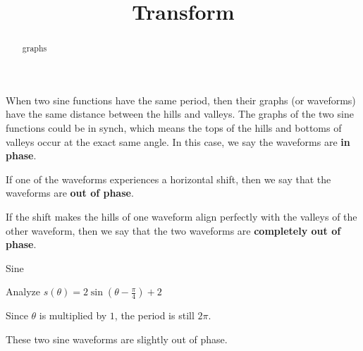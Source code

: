 \documentclass{ximera}
\title{Transform}
\begin{document}
\begin{abstract}
graphs
\end{abstract}
\maketitle



When two sine functions have the same period, then their graphs (or waveforms) have the same distance between the hills and valleys.   The graphs of the two sine functions could be in synch, which means the tops of the hills and bottoms of valleys occur at the exact same angle.  In this case, we say the waveforms are \textbf{in phase}.


If one of the waveforms experiences a horizontal shift, then we say that the waveforms are \textbf{out of phase}.

If the shift makes the hills of one waveform align perfectly with the valleys of the other waveform, then we say that the two waveforms are \textbf{completely out of phase}.




\begin{example}  Sine



Analyze $s(\theta) = 2 \sin\left(\theta - \frac{\pi}{4}\right) + 2$ \\





\begin{image}
\end{image}


Since $\theta$ is multiplied by $1$, the period is still $2\pi$.

These two sine waveforms are slightly out of phase.


\end{example}
\end{document}
